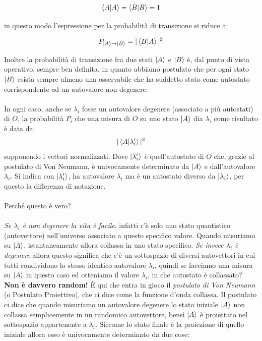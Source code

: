 \begin{align*}
	\braket{A} = \braket{B} = 1
\end{align*}

	in questo modo l'espressione per la probabilità di transizione si riduce a:
	
\begin{align*}
	P_{\ket{A} \to \ket{B}} = |\braket{B}{A}|^2
\end{align*}

	Inoltre la probabilità di transizione fra due stati $\ket{A}$ e $\ket{B}$ è, dal punto di vista operativo, sempre ben definita, in quanto abbiamo postulato che per ogni stato $\ket{B}$ esista sempre almeno una osservabile che ha suddetto stato come autostato corrispondente ad un autovalore non degenere.
	\\
	\\
	In ogni caso, anche se $\lambda_i$ fosse un autovalore degenere (associato a più autostati) di $O$, la probabilità $P_i$ che una misura di $O$ su uno stato $\ket{A}$ dia $\lambda_i$ come risultato è data da:
\begin{align*}
	|\braket{A}{\lambda_i'}|^2
\end{align*}
	supponendo i vettori normalizzati. Dove $\ket{\lambda_i'}$ è quell'autostato di $O$ che, grazie al postulato di Von Neumann, è univocamente determinato da $\ket{A}$ e dall'autovalore $\lambda_i$. Si indica con $\ket{\lambda_i'}$, ha autovalore $\lambda_i$ ma è un autostato diverso da $\ket{\lambda_i}$, per questo la differenza di notazione.
	\\
	\\
	Perché questo è vero?
	\\
	\\
	\textit{Se $\lambda_i$ è non degenere la vita è facile}, infatti c'è solo uno stato quantistico (autovettore) nell'universo associato a questo specifico valore. Quando misuriamo su $\ket{A}$, istantaneamente allora collassa in uno stato specifico. \textit{Se invece $\lambda_i$ è degenere} allora questo significa che c'è un sottospazio di diversi autovettori in cui tutti condividono lo stesso identico autovalore $\lambda_i$, quindi se facciamo una misura su $\ket{A}$ in questo caso ed otteniamo il valore $\lambda_i$, in che autostato è collassato? \textbf{Non è davvero random!} È qui che entra in gioco il \textit{postulato di Von Neumann} (o Postulato Proiettivo), che ci dice come la funzione d'onda collassa. Il postulato ci dice che quando misuriamo un autovalore degenere lo stato iniziale $\ket{A}$ non collassa semplicemente in un randomico autovettore, bensì $\ket{A}$ è proiettato nel sottospazio appartenente a $\lambda_i$. Siccome lo stato finale è la proiezione di quello iniziale allora esso è univocamente determinato da due cose:
	
